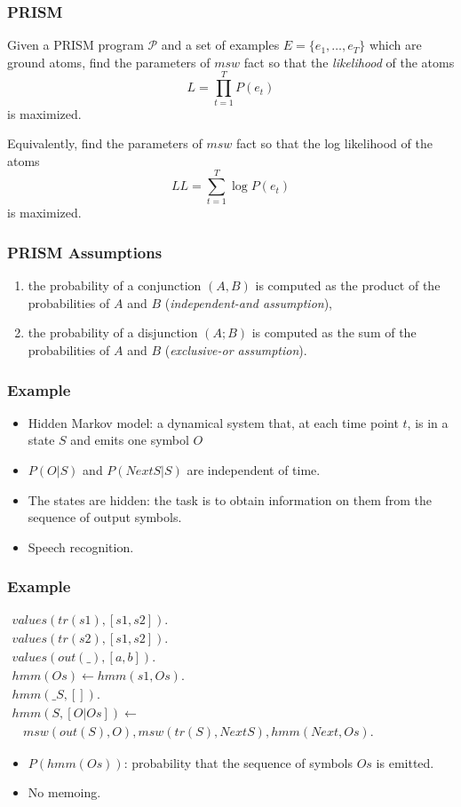 \documentclass[trans,aspectratio=1610]{beamer}
\newcommand{\defpprog}{\ensuremath{\mathcal{P}}\xspace}
\newcommand{\lpif}{\leftarrow}
\begin{document}
\begin{frame}
  \frametitle{PRISM}
\begin{definition}
Given a PRISM program \defpprog and a set of examples $E=\{e_1,\ldots,e_T\}$ which
are ground atoms,
find the parameters of $msw$ fact so that the \emph{likelihood} of the  atoms 
$$L=\prod_{t=1}^T P(e_t)$$
 is 
maximized.

Equivalently, find the parameters of $msw$ fact so that the log likelihood of the  atoms 
$$LL=\sum_{t=1}^T \log P(e_t)$$ is maximized.
\end{definition}
\end{frame}
\begin{frame}
  \frametitle{PRISM Assumptions}
\begin{enumerate}
\item  the probability of a conjunction
$(A, B)$ is computed as the product of the probabilities of $A$ and $B$ (\emph{independent-and assumption}), \label{ind}
\item
the probability of a disjunction $(A; B)$ is computed as the sum of the probabilities of $A$ and $B$
(\emph{exclusive-or assumption}). \label{ex}
\end{enumerate}
  \end{frame}
\begin{frame}
  \frametitle{Example}
  \begin{itemize}
\item Hidden Markov model:  a dynamical system that,
at each  time point $t$,  is in a state $S$ and
emits  one symbol $O$ 
\item  $P(O|S)$  and
$P(NextS|S)$ are independent of time.
\item The states are  hidden:
the task is to obtain information on them from the sequence of output symbols.
\item Speech recognition.
\end{itemize}
\end{frame}
\begin{frame}
  \frametitle{Example}

$\begin{array}{l}
values(tr(s1),[s1,s2]).\\
values(tr(s2),[s1,s2]).\\
values(out(\_),[a,b]).\\
hmm(Os)\lpif hmm(s1,Os).\\
hmm(\_S,[]).\\ 
hmm(S,[O|Os])\lpif \\
\ \ \ \ 
  msw(out(S),O),  msw(tr(S),NextS),  
  hmm(Next,Os).
\end{array}$

  \begin{itemize}
\item  $P(hmm(Os))$:
probability that the sequence of symbols $Os$ is emitted.
\item No \alert{memoing}.
\end{itemize}
\end{frame}
\end{document}
